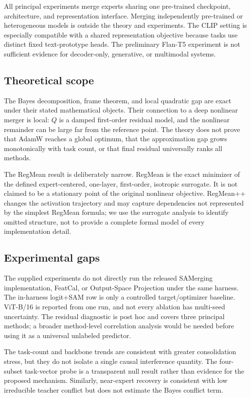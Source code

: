 \documentclass[letterpaper]{article} %
\theoremstyle{plain}
\theoremstyle{definition}
\begin{document}
All principal experiments merge experts sharing one pre-trained checkpoint, architecture, and representation interface.
Merging independently pre-trained or heterogeneous models is outside the theory and experiments.
The CLIP setting is especially compatible with a shared representation objective because tasks use distinct fixed text-prototype heads.
The preliminary Flan-T5 experiment is not sufficient evidence for decoder-only, generative, or multimodal systems.

\subsection{Theoretical scope}
The Bayes decomposition, frame theorem, and local quadratic gap are exact under their stated mathematical objects.
Their connection to a deep nonlinear merger is local: $Q$ is a damped first-order residual model, and the nonlinear remainder can be large far from the reference point.
The theory does not prove that AdamW reaches a global optimum, that the approximation gap grows monotonically with task count, or that final residual universally ranks all methods.

The RegMean result is deliberately narrow.
RegMean is the exact minimizer of the defined expert-centered, one-layer, first-order, isotropic surrogate.
It is not claimed to be a stationary point of the original nonlinear objective.
RegMean++ changes the activation trajectory and may capture dependencies not represented by the simplest RegMean formula; we use the surrogate analysis to identify omitted structure, not to provide a complete formal model of every implementation detail.

\subsection{Experimental gaps}
The supplied experiments do not directly run the released SAMerging implementation, FeatCal, or Output-Space Projection under the same harness.
The in-harness logit+SAM row is only a controlled target/optimizer baseline.
ViT-B/16 is reported from one run, and not every ablation has multi-seed uncertainty.
The residual diagnostic is post hoc and covers three principal methods; a broader method-level correlation analysis would be needed before using it as a universal unlabeled predictor.

The task-count and backbone trends are consistent with greater consolidation stress, but they do not isolate a single causal interference quantity.
The four-subset task-vector probe is a transparent null result rather than evidence for the proposed mechanism.
Similarly, near-expert recovery is consistent with low irreducible teacher conflict but does not estimate the Bayes conflict term.
\end{document}
